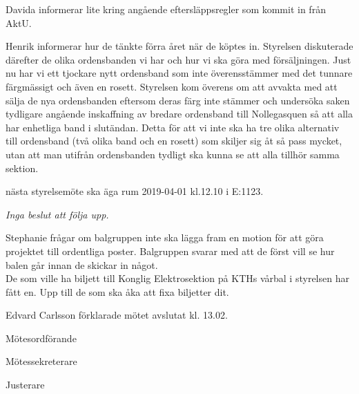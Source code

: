 \documentclass[10pt]{article}
\def\mo{Edvard Carlsson}
\def\ms{Sonja Kenari}
\def\ji{Davida Åström}
\begin{document}
\begin{paragrafer}
\begin{paragrafer}
\end{paragrafer}

Davida informerar lite kring angående eftersläppsregler som kommit in från AktU. 

Henrik informerar hur de tänkte förra året när de köptes in. Styrelsen diskuterade därefter de olika ordensbanden vi har och hur vi ska göra med försäljningen. Just nu har vi ett tjockare nytt ordensband som inte överensstämmer med det tunnare färgmässigt och även en rosett. Styrelsen kom överens om att avvakta med att sälja de nya ordensbanden eftersom deras färg inte stämmer och undersöka saken tydligare angående inskaffning av bredare ordensband till Nollegasquen så att alla har enhetliga band i slutändan. Detta för att vi inte ska ha tre olika alternativ till ordensband (två olika band och en rosett) som skiljer sig åt så pass mycket, utan att man utifrån ordensbanden tydligt ska kunna se att alla tillhör samma sektion.

\Mba nästa styrelsemöte ska äga rum 2019-04-01 kl.12.10 i E:1123.

\textit{Inga beslut att följa upp.}


Stephanie frågar om balgruppen inte ska lägga fram en motion för att göra projektet till ordentliga poster. Balgruppen svarar med att de först vill se hur balen går innan de skickar in något.\\
De som ville ha biljett till Konglig Elektrosektion på KTHs vårbal i styrelsen har fått en. Upp till de som ska åka att fixa biljetter dit.

{\mo} förklarade mötet avslutat kl. 13.02.
\end{paragrafer}

\hidesignfoot
\begin{signatures}{3}
\signature{\mo}{Mötesordförande}
\signature{\ms}{Mötessekreterare}
\signature{\ji}{Justerare}
\end{signatures}
\end{document}
